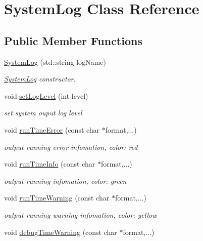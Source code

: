 \hypertarget{class_system_log}{}\section{System\+Log Class Reference}
\label{class_system_log}
\subsection*{Public Member Functions}
\begin{DoxyCompactItemize}
\item 
\hyperlink{class_system_log_aad41c68c3a8192ddb646170349023c99}{System\+Log} (std\+::string log\+Name)
\begin{DoxyCompactList}\small\item\em \hyperlink{class_system_log}{System\+Log} constructor. \end{DoxyCompactList}\item 
void \hyperlink{class_system_log_a21296bb67489848bad6cfa04280fec85}{set\+Log\+Level} (int level)
\begin{DoxyCompactList}\small\item\em set system ouput log level \end{DoxyCompactList}\item 
void \hyperlink{class_system_log_ac33b9f16ae96885ff7170d209a6af506}{run\+Time\+Error} (const char $\ast$format,...)
\begin{DoxyCompactList}\small\item\em output running error infomation, color\+: red \end{DoxyCompactList}\item 
void \hyperlink{class_system_log_ac9b085c959e3f97d547c997c2fca2613}{run\+Time\+Info} (const char $\ast$format,...)
\begin{DoxyCompactList}\small\item\em output running infomation, color\+: green \end{DoxyCompactList}\item 
void \hyperlink{class_system_log_a69d19a4affe470db2b740a1e9a78e6e5}{run\+Time\+Warning} (const char $\ast$format,...)
\begin{DoxyCompactList}\small\item\em output running warning infomation, color\+: yellow \end{DoxyCompactList}\item 
void \hyperlink{class_system_log_a08dff4b478ed29a39d584d3b7f21ddfb}{debug\+Time\+Warning} (const char $\ast$format,...)

\end{DoxyCompactItemize}
